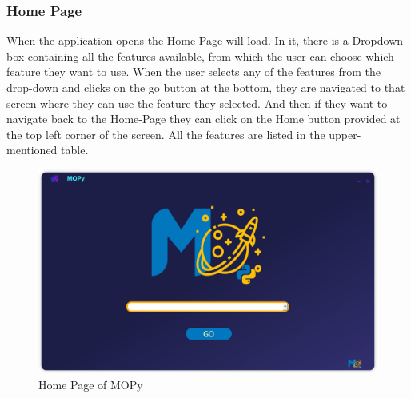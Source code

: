 \subsubsection{Home Page}
When the application opens the Home Page will load. In it, there is a Dropdown box containing all the features available, from which the user can choose which feature they want to use. When the user selects any of the features from the drop-down and clicks on the go button at the bottom, they are navigated to that screen where they can use the feature they selected. And then if they want to navigate back to the Home-Page they can click on the Home button provided at the top left corner of the screen. All the features are listed in the upper-mentioned table.
\begin{figure}[H]
\centering
\includegraphics[scale=0.6]{images/homepage.png}
\caption{Home Page of MOPy} \label{home}
\end{figure}